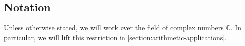 
\subsection{Notation}
\label{subsection:notation}
Unless otherwise stated, we will work over the field of complex numbers $\mathbb{C}$.
In particular, we will lift this restriction in
\autoref{section:arithmetic-applications}.

